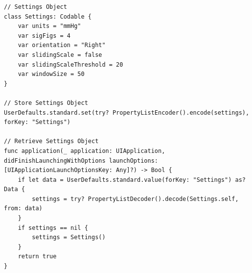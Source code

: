 \documentclass[onecolumn, draftclsnofoot,10pt, compsoc]{IEEEtran}
\begin{document}
\begin{lstlisting}
// Settings Object
class Settings: Codable {
    var units = "mmHg"
    var sigFigs = 4
    var orientation = "Right"
    var slidingScale = false
    var slidingScaleThreshold = 20
    var windowSize = 50
}

// Store Settings Object
UserDefaults.standard.set(try? PropertyListEncoder().encode(settings), forKey: "Settings")

// Retrieve Settings Object
func application(_ application: UIApplication, didFinishLaunchingWithOptions launchOptions: [UIApplicationLaunchOptionsKey: Any]?) -> Bool {
    if let data = UserDefaults.standard.value(forKey: "Settings") as? Data {
        settings = try? PropertyListDecoder().decode(Settings.self, from: data)
    }
    if settings == nil {
        settings = Settings()
    }
    return true
}

\end{lstlisting}
\end{document}
